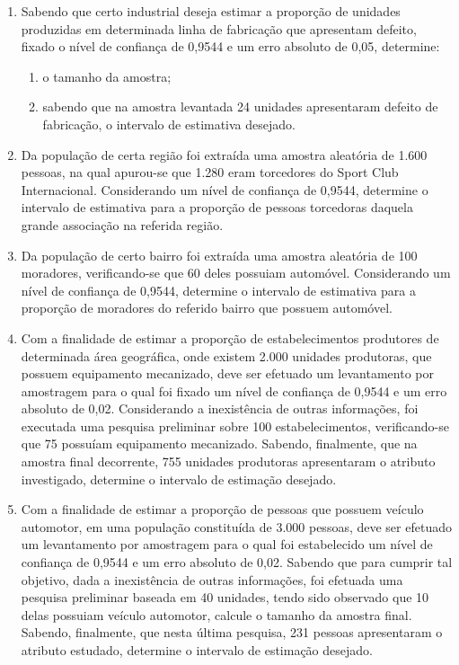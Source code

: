 \begin{enumerate}[resume]
\item Sabendo que certo industrial deseja estimar a proporção de unidades produzidas em determinada linha de fabricação que apresentam defeito, fixado o nível de confiança de 0,9544 e um erro absoluto de 0,05, determine:
	\begin{enumerate}
	\item o tamanho da amostra;
	\item sabendo que na amostra levantada 24 unidades apresentaram defeito de fabricação, o intervalo de estimativa desejado.
	\end{enumerate}

\item Da população de certa região foi extraída uma amostra aleatória de 1.600 pessoas, na qual apurou-se que 1.280 eram torcedores do Sport Club Internacional. Considerando um nível de confiança de 0,9544, determine o intervalo de estimativa para a proporção de pessoas torcedoras daquela grande associação na referida região.

\item Da população de certo bairro foi extraída uma amostra aleatória de 100 moradores, verificando-se que 60 deles possuiam automóvel. Considerando um nível de confiança de 0,9544, determine o intervalo de estimativa para a proporção de moradores do referido bairro que possuem automóvel.

\item Com a finalidade de estimar a proporção de estabelecimentos produtores de determinada área geográfica, onde existem 2.000 unidades produtoras, que possuem equipamento mecanizado, deve ser efetuado um levantamento por amostragem para o qual foi fixado um nível de confiança de 0,9544 e um erro absoluto de 0,02. Considerando a inexistência de outras informações, foi executada uma pesquisa preliminar sobre 100 estabelecimentos, verificando-se que 75 possuíam equipamento mecanizado. Sabendo, finalmente, que na amostra final decorrente, 755 unidades produtoras apresentaram o atributo investigado, determine o intervalo de estimação desejado.

\item Com a finalidade de estimar a proporção de pessoas que possuem veículo automotor, em uma população constituída de 3.000 pessoas, deve ser efetuado um levantamento por amostragem para o qual foi estabelecido um nível de confiança de 0,9544 e um erro absoluto de 0,02. Sabendo que para cumprir tal objetivo, dada a inexistência de outras informações, foi efetuada uma pesquisa preliminar baseada em 40 unidades, tendo sido observado que 10 delas possuiam veículo automotor, calcule o tamanho da amostra final. Sabendo, finalmente, que nesta última pesquisa, 231 pessoas apresentaram o atributo estudado, determine o intervalo de estimação desejado.


\end{enumerate}
